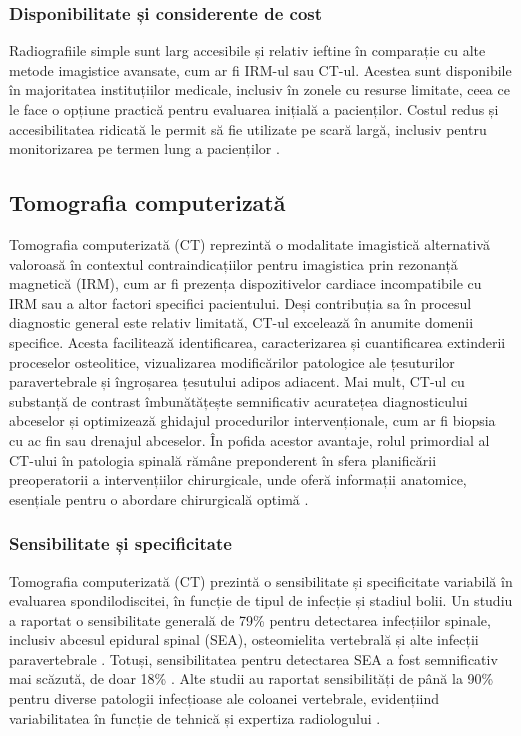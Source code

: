 \documentclass[romanian,12pt,a4paper]{article}
\begin{document}
\subsubsection{Disponibilitate și considerente de cost}

Radiografiile simple sunt larg accesibile și relativ ieftine în
comparație cu alte metode imagistice avansate, cum ar fi IRM-ul sau
CT-ul. Acestea sunt disponibile în majoritatea instituțiilor medicale,
inclusiv în zonele cu resurse limitate, ceea ce le face o opțiune
practică pentru evaluarea inițială a pacienților. Costul redus și
accesibilitatea ridicată le permit să fie utilizate pe scară largă,
inclusiv pentru monitorizarea pe termen lung a pacienților
\cite{ImagingSpondylodiscitisComprehensive2024}.

\subsection{Tomografia computerizată}

Tomografia computerizată (CT) reprezintă o modalitate imagistică
alternativă valoroasă în contextul contraindicațiilor pentru imagistica
prin rezonanță magnetică (IRM), cum ar fi prezența dispozitivelor
cardiace incompatibile cu IRM sau a altor factori specifici pacientului.
Deși contribuția sa în procesul diagnostic general este relativ
limitată, CT-ul excelează în anumite domenii specifice. Acesta
facilitează identificarea, caracterizarea și cuantificarea extinderii
proceselor osteolitice, vizualizarea modificărilor patologice ale
țesuturilor paravertebrale și îngroșarea țesutului adipos adiacent. Mai
mult, CT-ul cu substanță de contrast îmbunătățește semnificativ
acuratețea diagnosticului abceselor și optimizează ghidajul procedurilor
intervenționale, cum ar fi biopsia cu ac fin sau drenajul abceselor. În
pofida acestor avantaje, rolul primordial al CT-ului în patologia
spinală rămâne preponderent în sfera planificării preoperatorii a
intervențiilor chirurgicale, unde oferă informații anatomice, esențiale
pentru o abordare chirurgicală optimă
\cite{DiagnosticInterventionalManagement2020}.

\subsubsection{Sensibilitate și specificitate}

Tomografia computerizată (CT) prezintă o sensibilitate și specificitate
variabilă în evaluarea spondilodiscitei, în funcție de tipul de infecție
și stadiul bolii. Un studiu a raportat o sensibilitate generală de 79\%
pentru detectarea infecțiilor spinale, inclusiv abcesul epidural spinal
(SEA), osteomielita vertebrală și alte infecții paravertebrale
\cite{ImagingCharacteristicsCT2022}. Totuși, sensibilitatea pentru
detectarea SEA a fost semnificativ mai scăzută, de doar 18\%
\cite{ImagingCharacteristicsCT2022}. Alte studii au raportat
sensibilități de până la 90\% pentru diverse patologii infecțioase ale
coloanei vertebrale, evidențiind variabilitatea în funcție de tehnică și
expertiza radiologului \cite{ImagingAssessmentSpine2024}.
\end{document}
